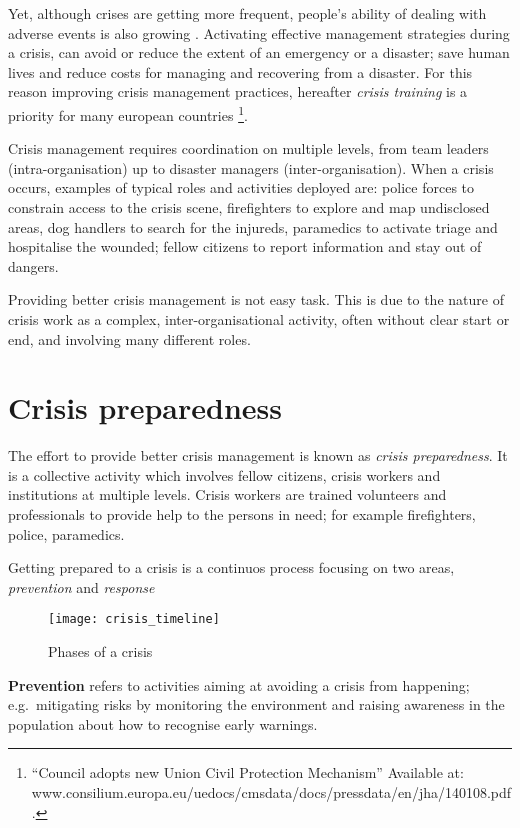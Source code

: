 Yet, although crises are getting more frequent, people's ability of dealing with adverse events is also growing \autocite{Boin:2009bv}. Activating effective management strategies during a crisis, can avoid or reduce the extent of an emergency or a disaster; save human lives and reduce costs for managing and recovering from a disaster. For this reason improving crisis management practices, hereafter \emph{crisis training} is a priority for many european countries \footnote{``Council adopts new Union Civil Protection Mechanism'' Available at: www.consilium.europa.eu/uedocs/cmsdata/docs/pressdata/en/jha/140108.pdf.}.

Crisis management requires coordination on multiple levels, from team leaders (intra-organisation) up to disaster managers (inter-organisation). When a crisis occurs, examples of typical roles and activities deployed are: police forces to constrain access to the crisis scene, firefighters to explore and map undisclosed areas, dog handlers to search for the injureds, paramedics to activate triage and hospitalise the wounded; fellow citizens to report information and stay out of dangers.

Providing better crisis management is not easy task. This is due to the nature of crisis work as a complex, inter-organisational activity, often without clear start or end, and involving many different roles.

\section{Crisis preparedness}\label{crisis-preparedness}

The effort to provide better crisis management is known as \emph{crisis preparedness}. It is a collective activity which involves fellow citizens, crisis workers and institutions at multiple levels. Crisis workers are trained volunteers and professionals to provide help to the persons in need; for example firefighters, police, paramedics.

Getting prepared to a crisis is a continuos process focusing on two areas, \emph{prevention} and \emph{response} \autocite{Deverell:2009fk}
\begin{figure}
	[h!] \centering 
	\texttt{[image: crisis\_timeline]} \caption{Phases of a crisis} \label{fig:phases} 
\end{figure}

\textbf{Prevention} refers to activities aiming at avoiding a crisis from happening; e.g.~mitigating risks by monitoring the environment and raising awareness in the population about how to recognise early warnings.

